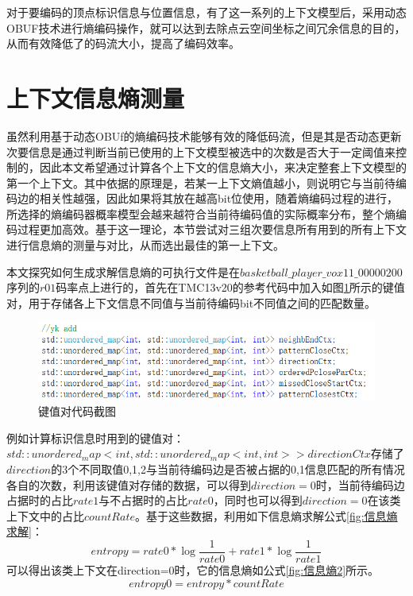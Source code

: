 \documentclass[bachelor,print,msfonts]{xduthesis}
\begin{document}
对于要编码的顶点标识信息与位置信息，有了这一系列的上下文模型后，采用动态OBUF技术进行熵编码操作，就可以达到去除点云空间坐标之间冗余信息的目的，从而有效降低了的码流大小，提高了编码效率。
\section{上下文信息熵测量}
\label{上下文信息熵测量}
虽然利用基于动态OBUf的熵编码技术能够有效的降低码流，但是其是否动态更新次要信息是通过判断当前已使用的上下文模型被选中的次数是否大于一定阈值来控制的，因此本文希望通过计算各个上下文的信息熵大小，来决定整套上下文模型的第一个上下文。其中依据的原理是，若某一上下文熵值越小，则说明它与当前待编码边的相关性越强，因此如果将其放在越高bit位使用，随着熵编码过程的进行，所选择的熵编码器概率模型会越来越符合当前待编码值的实际概率分布，整个熵编码过程更加高效。基于这一理论，本节尝试对三组次要信息所有用到的所有上下文进行信息熵的测量与对比，从而选出最佳的第一上下文。

本文探究如何生成求解信息熵的可执行文件是在$basketball\_player\_vox11\_00000200$序列的$r01$码率点上进行的，首先在TMC13v20的参考代码中加入如图\ref{fig:键值对}所示的键值对，用于存储各上下文信息不同值与当前待编码bit不同值之间的匹配数量。
\begin{figure}[htbp]
    \centering
    \includegraphics[scale=0.4]{image/键值对.png}
    \caption{键值对代码截图}
    \label{fig:键值对}
\end{figure}

例如计算标识信息时用到的键值对：$std::unordered_map<int, std::unordered_map<int, int>> directionCtx$存储了$direction$的3个不同取值0,1,2与当前待编码边是否被占据的0,1信息匹配的所有情况各自的次数，利用该键值对存储的数据，可以得到$direction=0$时，当前待编码边占据时的占比$rate1$与不占据时的占比$rate0$，同时也可以得到$direction=0$在该类上下文中的占比$countRate$。基于这些数据，利用如下信息熵求解公式\ref{fig:信息熵求解}：
\begin{equation}
    entropy = rate0*\log \frac{1}{{rate0}} + rate1*\log \frac{1}{{rate1}}
    \label{fig:信息熵求解}
\end{equation}
可以得出该类上下文在direction=0时，它的信息熵如公式\ref{fig:信息熵2}所示。
\begin{equation}
    entropy0 = entropy*countRate
    \label{fig:信息熵2}
\end{equation}
\end{document}
